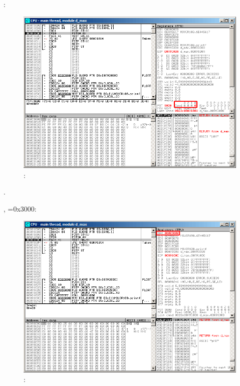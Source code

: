 
\clearpage
\FCOM {}:

\begin{figure}[H]
\centering
\includegraphics[scale=\FigScale]{patterns/12_FPU/3_comparison/x86/MSVC_Ox/olly2_2.png}
\caption{\olly: \FCOM {}}
\label{fig:FPU_comparison_Ox_case2_olly2}
\end{figure}

.

\clearpage
\FNSTSW {}, =0x3000:

\begin{figure}[H]
\centering
\includegraphics[scale=\FigScale]{patterns/12_FPU/3_comparison/x86/MSVC_Ox/olly2_3.png}
\caption{\olly: \FNSTSW {}}
\label{fig:FPU_comparison_Ox_case2_olly3}
\end{figure}

